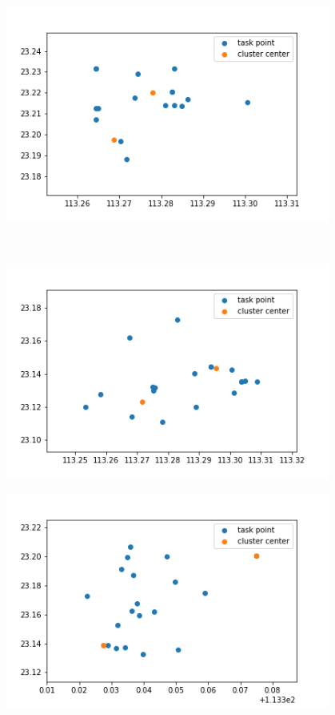 \begin{figure}
\begin{minipage}[c]{0.3\textwidth}
        \label{fig:sample-figure-b}
    \end{minipage}
    \begin{minipage}[c]{0.3\textwidth}
        \centering
        \includegraphics[width=0.95\textwidth]{83.png}
        \label{fig:sample-figure-c}
    \end{minipage}\\
    \begin{minipage}[c]{0.3\textwidth}
        \centering
        \includegraphics[width=0.95\textwidth]{96.png}
        \label{fig:sample-figure-a}
    \end{minipage}
    \begin{minipage}[c]{0.3\textwidth}
        \centering
        \includegraphics[width=0.95\textwidth]{113.png}

\end{minipage}
\end{figure}
